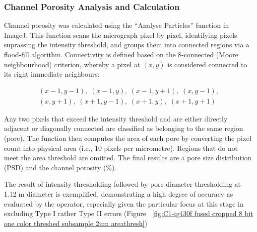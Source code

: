 \documentclass[review]{elsarticle}
\begin{document}
\subsubsection{Channel Porosity Analysis and Calculation}
Channel porosity was calculated using the “Analyse Particles” function in
ImageJ. This function scans the micrograph pixel by pixel, identifying pixels
suprassing the intensity threshold, and groups them into connected regions via a
flood-fill algorithm. Connectivity is defined based on the 8-connected (Moore
neighbourhood) criterion, whereby a pixel at $(x,y)$ is considered connected to
its eight immediate neighbours:

\begin{multline*}
(x-1,y-1),\; (x-1,y),\; (x-1,y+1),\; (x,y-1),\\[4pt]
(x,y+1),\; (x+1,y-1),\; (x+1,y),\; (x+1,y+1)
\end{multline*}

Any two pixels that exceed the intensity threshold and are either directly
adjacent or diagonally connected are classified as belonging to the same region
(pore). The function then computes the area of each pore by converting the pixel
count into physical area (i.e., 10 pixels per micrometre). Regions that do not
meet the area threshold are omitted. The final results are a pore size
distribution (PSD) and the channel porosity (\%).

The result of intensity thresholding followed by pore diameter thresholding at
1.12 m diameter is exemplified, demonstrating a high degree of accuracy as
evaluated by the operator, especially given the particular focus at this stage
in excluding Type I rather Type II errors (Figure ~\ref{fig:C1-ig430f fused
cropped 8 bit one color threshed subsample 2um areathresh})
\end{document}
